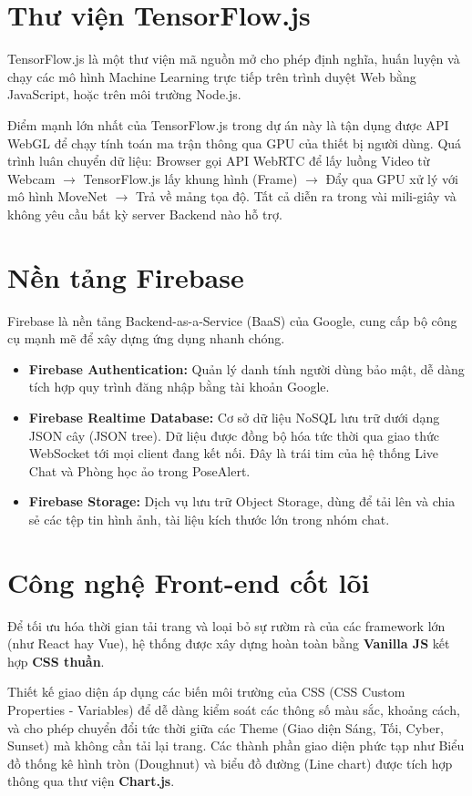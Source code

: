 \documentclass[12pt,a4paper]{report}
\begin{document}
\section{Thư viện TensorFlow.js}
TensorFlow.js là một thư viện mã nguồn mở cho phép định nghĩa, huấn luyện và chạy các mô hình Machine Learning trực tiếp trên trình duyệt Web bằng JavaScript, hoặc trên môi trường Node.js.

Điểm mạnh lớn nhất của TensorFlow.js trong dự án này là tận dụng được API WebGL để chạy tính toán ma trận thông qua GPU của thiết bị người dùng. Quá trình luân chuyển dữ liệu: Browser gọi API WebRTC để lấy luồng Video từ Webcam $\rightarrow$ TensorFlow.js lấy khung hình (Frame) $\rightarrow$ Đẩy qua GPU xử lý với mô hình MoveNet $\rightarrow$ Trả về mảng tọa độ. Tất cả diễn ra trong vài mili-giây và không yêu cầu bất kỳ server Backend nào hỗ trợ.

\section{Nền tảng Firebase}
Firebase là nền tảng Backend-as-a-Service (BaaS) của Google, cung cấp bộ công cụ mạnh mẽ để xây dựng ứng dụng nhanh chóng.
\begin{itemize}
    \item \textbf{Firebase Authentication:} Quản lý danh tính người dùng bảo mật, dễ dàng tích hợp quy trình đăng nhập bằng tài khoản Google.
    \item \textbf{Firebase Realtime Database:} Cơ sở dữ liệu NoSQL lưu trữ dưới dạng JSON cây (JSON tree). Dữ liệu được đồng bộ hóa tức thời qua giao thức WebSocket tới mọi client đang kết nối. Đây là trái tim của hệ thống Live Chat và Phòng học ảo trong PoseAlert.
    \item \textbf{Firebase Storage:} Dịch vụ lưu trữ Object Storage, dùng để tải lên và chia sẻ các tệp tin hình ảnh, tài liệu kích thước lớn trong nhóm chat.
\end{itemize}

\section{Công nghệ Front-end cốt lõi}
Để tối ưu hóa thời gian tải trang và loại bỏ sự rườm rà của các framework lớn (như React hay Vue), hệ thống được xây dựng hoàn toàn bằng \textbf{Vanilla JS} kết hợp \textbf{CSS thuần}. 

Thiết kế giao diện áp dụng các biến môi trường của CSS (CSS Custom Properties - Variables) để dễ dàng kiểm soát các thông số màu sắc, khoảng cách, và cho phép chuyển đổi tức thời giữa các Theme (Giao diện Sáng, Tối, Cyber, Sunset) mà không cần tải lại trang. Các thành phần giao diện phức tạp như Biểu đồ thống kê hình tròn (Doughnut) và biểu đồ đường (Line chart) được tích hợp thông qua thư viện \textbf{Chart.js}.
\end{document}
